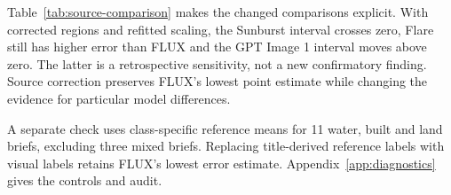 Table~\ref{tab:source-comparison} makes the changed comparisons explicit. With
corrected regions and refitted scaling, the Sunburst interval crosses zero,
Flare still has higher error than FLUX and the GPT Image 1 interval moves above zero. The latter
is a retrospective sensitivity, not a new confirmatory finding. Source correction
preserves FLUX's lowest point estimate while changing the evidence for particular
model differences.



\begin{samepage}
A separate check uses class-specific reference means for 11 water, built and
land briefs, excluding three mixed briefs. Replacing title-derived reference
labels with visual labels retains FLUX's lowest error estimate.
Appendix~\ref{app:diagnostics} gives the controls and audit.\par
\end{samepage}
